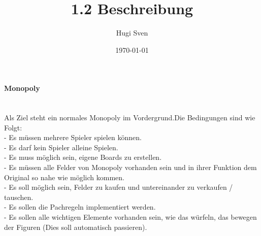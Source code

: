 \documentclass[a4paper,12pt]{article}
\begin{document}
	\title{1.2 Beschreibung}
	\author{Hugi Sven}
	\date{\today}
	\maketitle
	\paragraph{Monopoly} \mbox{}\\
	Als Ziel steht ein normales Monopoly im Vordergrund.Die Bedingungen sind wie Folgt:\\
	- Es müssen mehrere Spieler spielen können.\\
	- Es darf kein Spieler alleine Spielen.\\
	- Es muss möglich sein, eigene Boards zu erstellen.\\
	- Es müssen alle Felder von Monopoly vorhanden sein und in ihrer Funktion dem Original so nahe wie möglich kommen.\\
	- Es soll möglich sein, Felder zu kaufen und untereinander zu verkaufen / tauschen.\\
	- Es sollen die Pachregeln implementiert werden.\\
	- Es sollen alle wichtigen Elemente vorhanden sein, wie das würfeln, das bewegen der Figuren (Dies soll automatisch passieren).\\
	
\end{document}

